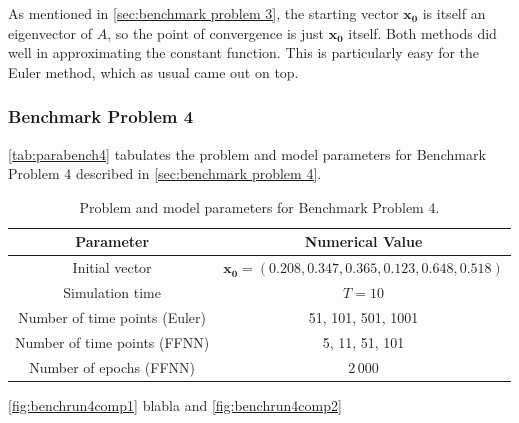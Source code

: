 As mentioned in \autoref{sec:benchmark problem 3}, the starting vector $\bm{x_0}$ is itself an eigenvector of $A$, so the point of convergence is just $\bm{x_0}$ itself. Both methods did well in approximating the constant function. This is particularly easy for the Euler method, which as usual came out on top.

\subsubsection{Benchmark Problem 4}

\autoref{tab:parabench4} tabulates the problem and model parameters for Benchmark Problem 4 described in \autoref{sec:benchmark problem 4}. 

\begin{table}[H]
\caption{Problem and model parameters for Benchmark Problem 4.}
\centering
{}
\begin{tabular}{c|c}
\hline
\hline 
Parameter & Numerical Value
\\
\hline 
\hline 
Initial vector & $\bm{x_0}=(0.208, 0.347, 0.365, 0.123, 0.648, 0.518)$
\\
Simulation time & $T=10$
\\
Number of time points (Euler) & 51, 101, 501, 1001
\\
Number of time points (FFNN) & 5, 11, 51, 101
\\
Number of epochs (FFNN) & $2\,000$
\\
\hline
\hline 
\end{tabular}
\label{tab:parabench4}
\end{table}

\autoref{fig:benchrun4comp1} blabla and \autoref{fig:benchrun4comp2} 

